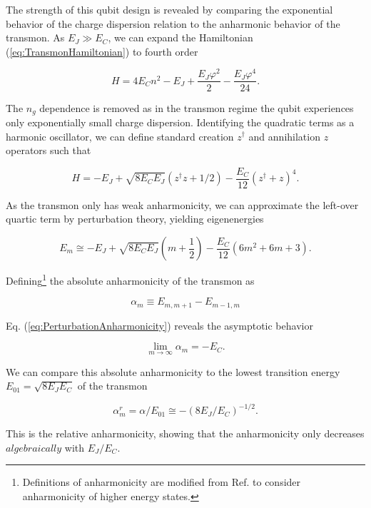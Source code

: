 \documentclass[11 pt, oneside]{book} %
\begin{document}
The strength of this qubit design is revealed by comparing the exponential behavior of the charge dispersion relation to the anharmonic behavior of the transmon. As $E_J\gg E_C$, we can expand the Hamiltonian (\ref{eq:TransmonHamiltonian}) to fourth order

\begin{equation}
H=4E_Cn^2-E_J +\frac{E_J\varphi^2}{2}-\frac{E_J\varphi^4}{24}.
\end{equation}
 
The $n_g$ dependence is removed as in the transmon regime the qubit experiences only exponentially small charge dispersion. Identifying the quadratic terms as a harmonic oscillator, we can define standard  creation $z^{\dag}$ and annihilation $z$ operators such that 

\begin{equation}
H=-E_J+\sqrt{8E_CE_J}(z^{\dag}z+1/2)-\frac{E_C}{12}(z^{\dag}+z)^4.
\end{equation}

As the transmon only has weak anharmonicity, we can approximate the left-over quartic term by perturbation theory, yielding eigenenergies

\begin{equation}\label{eq:PerturbationAnharmonicity}
E_m\cong-E_J+\sqrt{8E_CE_J}\left( m+\frac{1}{2}\right)-\frac{E_C}{12}(6m^2+6m+3).
\end{equation}

Defining\footnote{Definitions of anharmonicity are modified from Ref. \cite{Koch} to consider anharmonicity of higher energy states.} the absolute anharmonicity of the transmon as 

\begin{equation}
\alpha_m \equiv E_{m,m+1}-E_{m-1,m}
\end{equation}

Eq. (\ref{eq:PerturbationAnharmonicity}) reveals the asymptotic behavior

\begin{equation}
\lim_{m\rightarrow\infty}\alpha_m =-E_C.
\end{equation}

We can compare this absolute anharmonicity to the lowest transition energy $E_{01}=\sqrt{8E_JE_C}$ of the transmon

\begin{equation}
\alpha_m^r = \alpha/E_{01}\cong-(8E_J/E_C)^{-1/2}.
\end{equation}

This is the relative anharmonicity, showing that the anharmonicity only decreases $algebraically$ with $E_J/E_C$.
\end{document}
